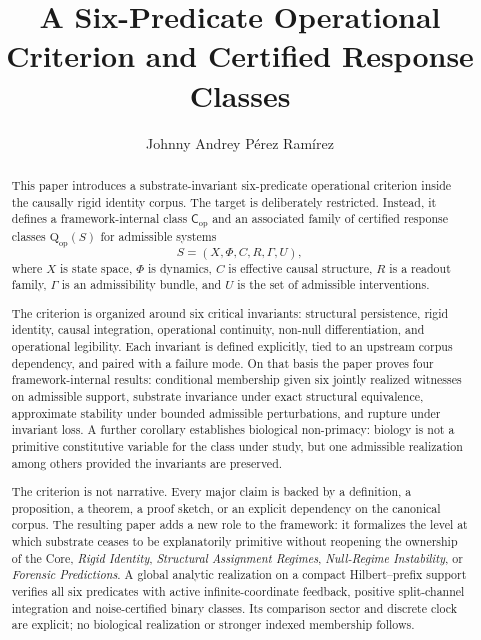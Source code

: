 \documentclass[11pt,a4paper]{article}
\title{\textbf{A Six-Predicate Operational Criterion and Certified Response Classes}}
\author{Johnny Andrey P\'{e}rez Ram\'{i}rez}
\date{}
\theoremstyle{definition}
\newcommand{\Cop}{\mathsf{C}_{\mathrm{op}}}
\newcommand{\Qop}{\mathrm{Q}_{\mathrm{op}}}
\begin{document}
\setlength{\emergencystretch}{3em}
\maketitle

\begin{abstract}
This paper introduces a substrate-invariant six-predicate operational criterion inside the causally rigid identity corpus. The target is deliberately restricted. Instead, it defines a framework-internal class $\Cop$ and an associated family of certified response classes $\Qop(S)$ for admissible systems
\[
S = (X,\Phi,C,R,\Gamma,U),
\]
where $X$ is state space, $\Phi$ is dynamics, $C$ is effective causal structure, $R$ is a readout family, $\Gamma$ is an admissibility bundle, and $U$ is the set of admissible interventions.

The criterion is organized around six critical invariants: structural persistence, rigid identity, causal integration, operational continuity, non-null differentiation, and operational legibility. Each invariant is defined explicitly, tied to an upstream corpus dependency, and paired with a failure mode. On that basis the paper proves four framework-internal results: conditional membership given six jointly realized witnesses on admissible support, substrate invariance under exact structural equivalence, approximate stability under bounded admissible perturbations, and rupture under invariant loss. A further corollary establishes biological non-primacy: biology is not a primitive constitutive variable for the class under study, but one admissible realization among others provided the invariants are preserved.

The criterion is not narrative. Every major claim is backed by a definition, a proposition, a theorem, a proof sketch, or an explicit dependency on the canonical corpus. The resulting paper adds a new role to the framework: it formalizes the level at which substrate ceases to be explanatorily primitive without reopening the ownership of the Core, \textit{Rigid Identity}, \textit{Structural Assignment Regimes}, \textit{Null-Regime Instability}, or \textit{Forensic Predictions}.
A global analytic realization on a compact Hilbert--prefix support verifies all six predicates with active infinite-coordinate feedback, positive split-channel integration and noise-certified binary classes. Its comparison sector and discrete clock are explicit; no biological realization or stronger indexed membership follows.
\end{abstract}
\end{document}
